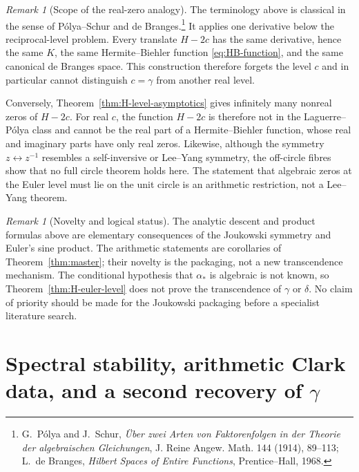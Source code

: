 \documentclass[11pt]{article}
\theoremstyle{definition}
\theoremstyle{remark}
\newtheorem{remark}[theorem]{Remark}
\newcommand{\Eexp}{\mathcal E_{\mathrm{exp}}}
\begin{document}
\begin{remark}[Scope of the real-zero analogy]
The terminology above is classical in the sense of P\'olya--Schur and de
Branges.\footnote{G.~P\'olya and J.~Schur, \emph{Über zwei Arten von
Faktorenfolgen in der Theorie der algebraischen Gleichungen}, J. Reine
Angew. Math. 144 (1914), 89--113; L.~de Branges, \emph{Hilbert Spaces of
Entire Functions}, Prentice--Hall, 1968.}
It applies one derivative below the reciprocal-level problem.  Every
translate $H-2c$ has the same derivative, hence the same $K$, the same
Hermite--Biehler function \eqref{eq:HB-function}, and the same canonical de
Branges space.  This construction therefore forgets the level $c$ and in
particular cannot distinguish $c=\gamma$ from another real level.

Conversely, Theorem~\ref{thm:H-level-asymptotics} gives infinitely many
nonreal zeros of $H-2c$.  For real $c$, the function $H-2c$ is therefore not
in the Laguerre--P\'olya class and cannot be the real part of a
Hermite--Biehler function, whose real and imaginary parts have only real
zeros.  Likewise, although the symmetry $z\leftrightarrow z^{-1}$ resembles
a self-inversive or Lee--Yang symmetry, the off-circle fibres show that no
full circle theorem holds here.  The statement that algebraic zeros at the
Euler level must lie on the unit circle is an arithmetic restriction, not a
Lee--Yang theorem.
\end{remark}

\begin{remark}[Novelty and logical status]
The analytic descent and product formulas above are elementary consequences
of the Joukowski symmetry and Euler's sine product.  The arithmetic
statements are corollaries of Theorem~\ref{thm:master}; their novelty is the
packaging, not a new transcendence mechanism.  The conditional hypothesis
that $\alpha_*$ is algebraic is not known, so
Theorem~\ref{thm:H-euler-level} does not prove the transcendence of
$\gamma$ or $\delta$.  No claim of priority should be made for the
Joukowski packaging before a specialist literature search.
\end{remark}

\providecommand{\Eexp}{\mathcal E_{\mathrm{exp}}}

\section{Spectral stability, arithmetic Clark data, and a second
recovery of \texorpdfstring{$\gamma$}{gamma}}
\label{sec:ssc-spectral-stability-clark}
\end{document}
